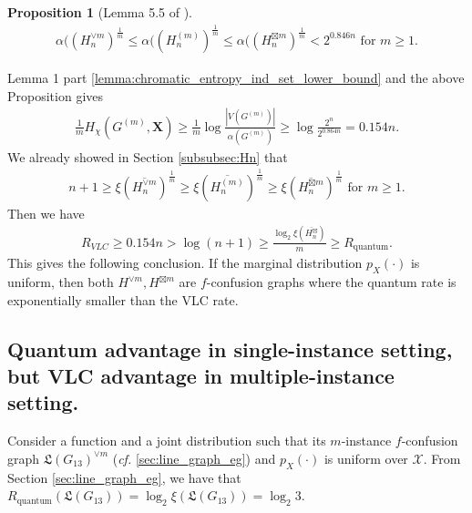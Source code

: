 \documentclass[journal, onecolumn, draftcls]{IEEEtran}
\theoremstyle{definition}
\newtheorem{proposition}{Proposition}
\newcommand{\calX}{\mathcal{X}}
\newcommand{\bfX}{\mathbf{X}}
\newcommand{\frL}{\mathfrak{L}}
\newcommand{\meng}[1]{\marginpar{+}{\bf Ruoyu's remark}: {\em #1}}
\begin{document}
\begin{proposition}[Lemma 5.5 of \cite{BrietBL_15}]\label{prop:upper_bound_alpha_H_n}
    \begin{align*}
       \alpha((H_n^{\lor m})^{\frac{1}{m}} \le \alpha((H_n^{ ( m)})^{\frac{1}{m}}\le \alpha((H_n^{\boxtimes m})^{\frac{1}{m}} < 2^{0.846n}\text{ for }m\ge 1.
    \end{align*}
\end{proposition}
Lemma 1 part \ref{lemma:chromatic_entropy_ind_set_lower_bound} and the above Proposition gives
\begin{align*}
\frac{1}{m}H_{\chi}(G^{(m)},\bfX)\ge \frac{1}{m} \log \frac{|V(G^{(m)})|}{\alpha(G^{(m)})} \ge \log \frac{2^{n}}{2^{0.864n}} = {0.154 n}.
\end{align*}
We already showed in Section \ref{subsubsec:Hn} that  
\begin{align*} n+1  \ge \xi(\overline{H_n^{\lor m}})^{\frac{1}{m}}\ge\xi(\overline{H_n^{(m)}})^{\frac{1}{m}} \ge \xi(\overline{H_n^{\boxtimes m}})^{\frac{1}{m}}\text{ for }m\ge 1.
\end{align*}
Then we have
\begin{align*}
    R_{VLC} \ge 0.154n > \log (n +1)\ge  \frac{\log_2\xi(\overline{H_n^{\boxtimes }})}{m}\ge R_{\text{quantum}}.
\end{align*}
This gives the following conclusion. If the marginal distribution $p_X(\cdot)$ is uniform, then both $H^{\lor m},H^{\boxtimes m}$ are $f$-confusion graphs where the quantum rate is exponentially smaller than the VLC rate.%

\subsection{Quantum advantage   in single-instance setting, but VLC advantage in multiple-instance setting.\label{sec:VLC_line_graph}}



Consider a function and a joint distribution such that its $m$-instance $f$-confusion graph $\frL(G_{13})^{\lor m}$ ({\it cf.} \ref{sec:line_graph_eg}) and $p_X(\cdot)$ is uniform over $\calX$. From Section \ref{sec:line_graph_eg}, we have that $R_{\text{quantum}}(\frL(G_{13}))=\log_2\xi(\frL(G_{13}))=\log_2 3.$ 
\end{document}
